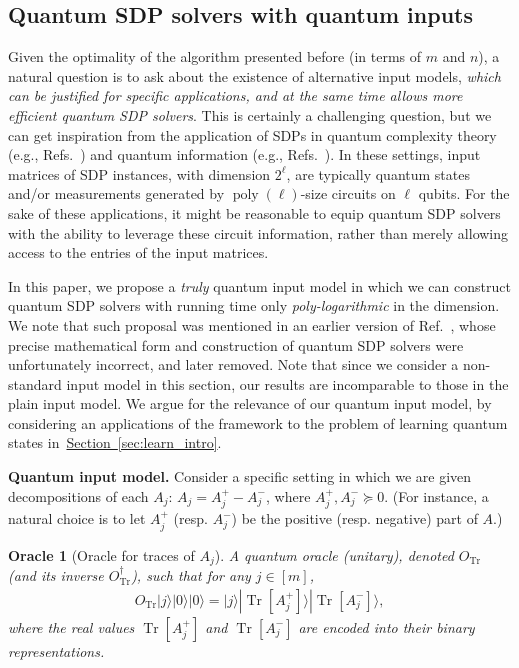 \documentclass[a4paper,UKenglish,cleveref, autoref]{lipics-v2019}
\newtheorem{oracle}{Oracle}
\theoremstyle{remark}
\numberwithin{equation}{section}
\numberwithin{oracle}{section}
\numberwithin{remark}{section}
\renewcommand{\sec}[1]{\hyperref[sec:#1]{Section~\ref*{sec:#1}}}
\def\>{\rangle}
\newcommand{\range}[1]{[#1]}
\DeclareMathOperator{\poly}{poly}
\DeclareMathOperator{\Tr}{Tr}
\newcommand{\hd}[1]{\vspace{2mm} \noindent \textbf{#1}}
\begin{document}
\subsection{Quantum SDP solvers with quantum inputs}
Given the optimality of the algorithm presented before (in terms of $m$ and $n$), a natural question is to ask about the existence of alternative input models, \emph{which can be justified for specific applications, and at the same time allows more efficient quantum SDP solvers}. This is certainly a challenging question, but we can get inspiration from the application of SDPs in quantum complexity theory (e.g., Refs.~\cite{jain2011qip,gutoski2012parallel}) and quantum information (e.g., Refs.~\cite{aaronson2007learnability, aaronson2017quantum}). In these settings, input matrices of SDP instances, with dimension $2^\ell$, are typically quantum states and/or measurements generated by $\poly(\ell)$-size circuits on $\ell$ qubits.
For the sake of these applications, it might be reasonable to equip quantum SDP solvers with the ability to leverage these circuit information, rather than merely allowing access to the entries of the input matrices.

In this paper, we propose a \emph{truly} quantum input model in which we can construct quantum SDP solvers with running time only \emph{poly-logarithmic} in the dimension.
We note that such proposal was mentioned in an earlier version of Ref.~\cite{brandao2016quantum}, whose precise mathematical form and construction of quantum SDP solvers were unfortunately incorrect, and later removed.
Note that since we consider a non-standard input model in this section, our results are incomparable to those in the plain input model. We argue for the relevance of our quantum input model, by considering an applications of the framework to the problem of learning quantum states in~\sec{learn_intro}.

\hd{Quantum input model.}
Consider a specific setting in which we are given decompositions of each $A_j$: $A_j=A_j^+ -A_j^-$, where $A_j^+, A_j^- \succeq 0$. (For instance, a natural choice is to let $A_j^+$ (resp. $A_j^-$) be the positive (resp. negative) part of $A$.)

\begin{oracle}[Oracle for traces of $A_{j}$] \label{ora:1}
A quantum oracle (unitary), denoted $O_{\Tr}$ (and its inverse $O_{\Tr}^{\dagger}$), such that for any $j\in\range{m}$,
\begin{align}
O_{\Tr}|j\>|0\>|0\>=|j\>|\Tr[A_{j}^{+}]\>|\Tr[A_{j}^{-}]\>,
\end{align}
where the real values $\Tr[A_{j}^{+}]$ and $\Tr[A_{j}^{-}]$ are encoded into their binary representations.
\end{oracle}
\end{document}
